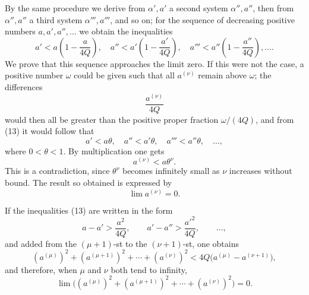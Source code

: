 \documentclass[11pt]{article}
\begin{document}
By the same procedure we derive from $\alpha',a'$ a second system $\alpha'',a''$, then from $\alpha'',a''$ a third system $\alpha''',a'''$, and so on; for the sequence of decreasing positive numbers $a,a',a'',\ldots$ we obtain the inequalities
\begin{equation}
 a'<a\left(1-\frac{a}{4Q}\right),\quad
 a''<a'\left(1-\frac{a'}{4Q}\right),\quad
 a'''<a''\left(1-\frac{a''}{4Q}\right),\ldots .
\tag{13}
\end{equation}
We prove that this sequence approaches the limit zero. If this were not the case, a positive number $\omega$ could be given such that all $a^{(\nu)}$ remain above $\omega$; the differences
\[
 \frac{a^{(\nu)}}{4Q}
\]
would then all be greater than the positive proper fraction $\omega/(4Q)$, and from (13) it would follow that
\[
 a'<a\theta,
 \quad a''<a'\theta,
 \quad a'''<a''\theta,
 \quad\ldots,
\]
where $0<\theta<1$. By multiplication one gets
\begin{equation}
 a^{(\nu)}<a\theta^\nu.
\tag{14}
\end{equation}
This is a contradiction, since $\theta^\nu$ becomes infinitely small as $\nu$ increases without bound. The result so obtained is expressed by
\begin{equation}
 \lim a^{(\nu)}=0.
\tag{15}
\end{equation}

If the inequalities (13) are written in the form
\[
 a-a'>\frac{a^2}{4Q},\qquad
 a'-a''>\frac{a'^2}{4Q},\qquad\ldots,
\]
and added from the $(\mu+1)$-st to the $(\nu+1)$-st, one obtains
\[
 (a^{(\mu)})^2+(a^{(\mu+1)})^2+\cdots+(a^{(\nu)})^2
 <4Q\bigl(a^{(\mu)}-a^{(\nu+1)}\bigr),
\]
and therefore, when $\mu$ and $\nu$ both tend to infinity,
\begin{equation}
 \lim\bigl((a^{(\mu)})^2+(a^{(\mu+1)})^2+\cdots+(a^{(\nu)})^2\bigr)=0.
\tag{16}
\end{equation}
\end{document}
